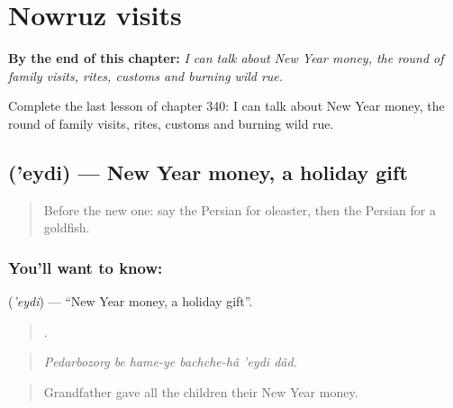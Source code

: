
\chapter{Nowruz visits}
\label{ch:fa-nowruz-visits}

\begin{chapteropening}
\textbf{By the end of this chapter:} \emph{I can talk about New Year money, the round of family visits, rites, customs and burning wild rue.}

Complete the last lesson of chapter 340: I can talk about New Year money, the round of family visits, rites, customs and burning wild rue.
\end{chapteropening}

\section[\texorpdfstring{\fa{عیدی} ('eydi)}{عیدی ('eydi)}]{ ('eydi) — New Year money, a holiday gift}

\label{lesson:FA-C340-eydi}



\begin{quote}
Before the new one: say the Persian for oleaster, then the Persian for a goldfish.
\end{quote}

\subsection*{You'll want to know: }
\textbf{} (\emph{'eydi}) — \textquotedblleft{}New Year money, a holiday gift\textquotedblright{}.

\begin{quote}
      .
\end{quote}

\begin{quote}
\emph{Pedarbozorg be hame-ye bachche-hâ 'eydi dâd.}
\end{quote}

\begin{quote}
Grandfather gave all the children their New Year money.
\end{quote}

